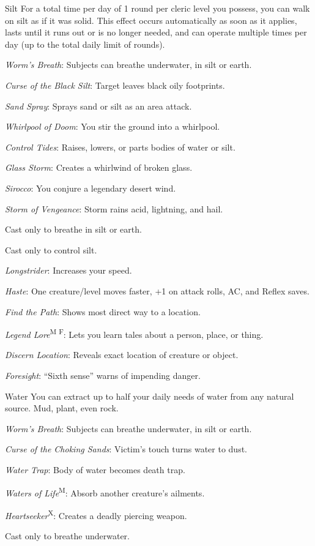 {Silt}
{For a total time per day of 1 round per cleric level you possess, you can walk on silt as if it was solid. This effect occurs automatically as soon as it applies, lasts until it runs out or is no longer needed, and can operate multiple times per day (up to the total daily limit of rounds).}
{
	\item \textit{Worm's Breath}\footnotemark[1]: Subjects can breathe underwater, in silt or earth.
	\item \textit{Curse of the Black Silt}: Target leaves black oily footprints.
	\item \textit{Sand Spray}: Sprays sand or silt as an area attack.
	\item \textit{Whirlpool of Doom}: You stir the ground into a whirlpool.
	\item \textit{Control Tides}\footnotemark[2]: Raises, lowers, or parts bodies of water or silt.
	\item 
	\item \textit{Glass Storm}: Creates a whirlwind of broken glass.
	\item \textit{Sirocco}: You conjure a legendary desert wind.
	\item \textit{Storm of Vengeance}: Storm rains acid, lightning, and hail.
}
 Cast only to breathe in silt or earth.

 Cast only to control silt.

{}
{}
{
	\item \textit{Longstrider}: Increases your speed.
	\item 
	\item 
	\item \textit{Haste}: One creature/level moves faster, +1 on attack rolls, AC, and Reflex saves.
	\item 
	\item \textit{Find the Path}: Shows most direct way to a location.
	\item \textit{Legend Lore}\textsuperscript{M F}: Lets you learn tales about a person, place, or thing.
	\item \textit{Discern Location}: Reveals exact location of creature or object.
	\item \textit{Foresight}: ``Sixth sense'' warns of impending danger.
}

{Water}
{You can extract up to half your daily needs of water from any natural source. Mud, plant, even rock.}
{
	\item \textit{Worm's Breath}\footnotemark[1]: Subjects can breathe underwater, in silt or earth.
	\item 
	\item 
	\item \textit{Curse of the Choking Sands}: Victim's touch turns water to dust.
	\item \textit{Water Trap}: Body of water becomes death trap.
	\item \textit{Waters of Life}\textsuperscript{M}: Absorb another creature's ailments.
	\item 
	\item 
	\item \textit{Heartseeker}\textsuperscript{X}: Creates a deadly piercing weapon.
}
 Cast only to breathe underwater.